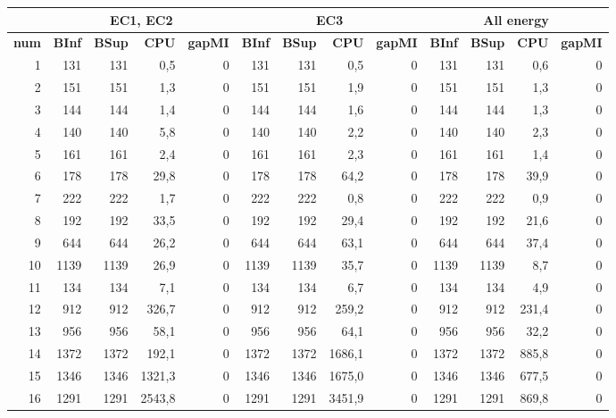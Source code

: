 {%
\begin{table}[H]
	\centering
	\small
	\begin{tabular}{|r|rrrr|rrrr|rrrr|}
		\hline
		\toprule
		\rowcolor{cyan}	&\multicolumn{4}{c|}{\textbf{ EC1, EC2}}     & \multicolumn{4}{c|}{\textbf{ EC3}} & \multicolumn{4}{c|}{\textbf{ All energy}} \\\hline
		\midrule
		\rowcolor{cyan}	\textbf{num} & \textbf{BInf} & \textbf{BSup}  & \textbf{CPU} & \textbf{gapMI} &  \textbf{BInf} & \textbf{BSup}  &\textbf{CPU} & \textbf{gapMI} &  \textbf{BInf} & \textbf{BSup}  &\textbf{CPU} & \textbf{gapMI} \\\hline
		\midrule
		1	&	131	&	131	&	0,5	&	0	&	131	&	131	&	0,5	&	0	&	131	&	131	&	0,6	&	0	\\ \hline
		2	&	151	&	151	&	1,3	&	0	&	151	&	151	&	1,9	&	0	&	151	&	151	&	1,3	&	0	\\ \hline
		3	&	144	&	144	&	1,4	&	0	&	144	&	144	&	1,6	&	0	&	144	&	144	&	1,3	&	0	\\ \hline
		4	&	140	&	140	&	5,8	&	0	&	140	&	140	&	2,2	&	0	&	140	&	140	&	2,3	&	0	\\ \hline
		5	&	161	&	161	&	2,4	&	0	&	161	&	161	&	2,3	&	0	&	161	&	161	&	1,4	&	0	\\ \hline
		6	&	178	&	178	&	29,8	&	0	&	178	&	178	&	64,2	&	0	&	178	&	178	&	39,9	&	0	\\ \hline
		7	&	222	&	222	&	1,7	&	0	&	222	&	222	&	0,8	&	0	&	222	&	222	&	0,9	&	0	\\ \hline
		8	&	192	&	192	&	33,5	&	0	&	192	&	192	&	29,4	&	0	&	192	&	192	&	21,6	&	0\\ \hline
		9	&	644	&	644	&	26,2	&	0	&	644	&	644	&	63,1	&	0	&	644	&	644	&	37,4	&	0	\\ \hline
		10	&	1139	&	1139	&	26,9	&	0	&	1139	&	1139	&	35,7	&	0	&	1139	&	1139	&	8,7	&	0	\\ \hline
		11	&	134	&	134	&	7,1	&	0	&	134	&	134	&	6,7	&	0	&	134	&	134	&	4,9	&	0	\\ \hline
		12	&	912	&	912	&	326,7	&	0	&	912	&	912	&	259,2	&	0	&	912	&	912	&	231,4	&	0	\\ \hline
		13	&	956	&	956	&	58,1	&	0	&	956	&	956	&	64,1	&	0	&	956	&	956	&	32,2	&	0	\\ \hline
		14	&	1372	&	1372	&	192,1	&	0	&	1372	&	1372	&	1686,1	&	0	&	1372	&	1372	&	885,8	&	0	\\ \hline
		15	&	1346	&	1346	&	1321,3	&	0	&	1346	&	1346	&	1675,0	&	0	&	1346	&	1346	&	677,5	&	0	\\ \hline
		16	&	1291	&	1291	&	2543,8	&	0	&	1291	&	1291	&	3451,9	&	0	&	1291	&	1291	&	869,8	&	0	\\ \hline

\end{tabular}
\end{table}}
